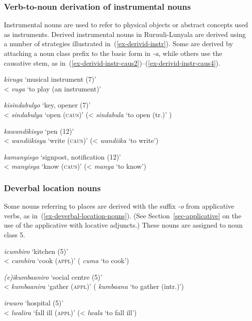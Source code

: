 \subsubsection{Verb-to-noun derivation of instrumental nouns}
Instrumental nouns are used to refer to physical objects or abstract concepts used as instruments. 
Derived instrumental nouns in Ru\-ruu\-li\hyp{}Lu\-nya\-la are derived using a number of strategies illustrated in~(\ref{ex-derivid-instr}). 
Some are derived by attaching a noun class prefix to the basic form in  \textit{-a}, while others use the causative stem, as in~(\ref{ex-derivid-instr-caus2})–(\ref{ex-derivid-instr-caus4}).
 
\ea \label{ex-derivid-instr}
\begin{xlist}
	\ex  \textit{kivuga} `musical instrument (7)' \\ <  \textit{vuga} `to play (an instrument)'
	
	\ex  \label{ex-derivid-instr-caus2}
	 \textit{kisindabulyo} `key, opener (7)' \\ <  \textit{sindabulya} `open (\textsc{caus})' (<  \textit{sindabula} `to open (tr.)' )
	
	\ex   \textit{kawandikisyo} `pen (12)' \\ <   \textit{wandiikisya} `write (\textsc{caus})' (<  \textit{wandiika} `to write')
	
	\ex 	\label{ex-derivid-instr-caus4}
	 \textit{kamanyisyo} `signpost, notification (12)' \\
	<  \textit{manyisya} `know (\textsc{caus})' (<  \textit{manya} `to know')
\end{xlist}
\z


\subsubsection{Deverbal location nouns} 
Some nouns referring to places are derived with the suffix  \textit{-o} from applicative verbs, as in~(\ref{ex-deverbal-location-nouns}). 
(See Section~\ref{sec-applicative} on the use of the applicative with locative adjuncts.) 
These nouns are assigned to noun class 5.

\ea \label{ex-deverbal-location-nouns}
\begin{xlist}
	\ex \textit{icumbiro} ‘kitchen (5)’ \\
	<   \textit{cumbira} `cook (\textsc{appl})' ( \textit{cuma} ‘to cook’)
	
	\ex  \textit{(e)ikumbaaniro} ‘social centre (5)'\\ 
	<  \textit{kumbaanira}  `gather (\textsc{appl})' ( \textit{kumbaana} ‘to gather (intr.)’)
	
	\ex  \textit{irwaro} ‘hospital (5)' \\
	<  \textit{lwalira}  `fall ill (\textsc{appl})' (<  \textit{lwala} ‘to fall ill’)
\end{xlist}
\z


